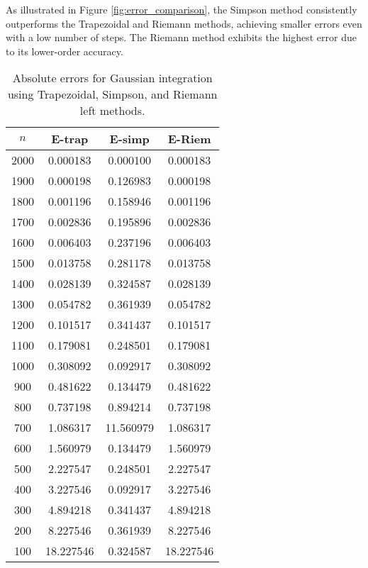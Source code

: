 \documentclass[twocolumn, 11pt]{article}
\begin{document}
As illustrated in Figure \ref{fig:error_comparison}, the Simpson method consistently outperforms the Trapezoidal and Riemann methods, achieving smaller errors even with a low number of steps. The Riemann method exhibits the highest error due to its lower-order accuracy.

\begin{table}[h!]
    \centering
    \begin{tabular}{|c|c|c|c|}
    \hline
    \textbf{\(n\)} & \textbf{E-trap} & \textbf{E-simp} & \textbf{E-Riem} \\
    \hline
    2000 & 0.000183 & 0.000100 & 0.000183 \\
    1900 & 0.000198 & 0.126983 & 0.000198 \\
    1800 & 0.001196 & 0.158946 & 0.001196 \\
    1700 & 0.002836 & 0.195896 & 0.002836 \\
    1600 & 0.006403 & 0.237196 & 0.006403 \\
    1500 & 0.013758 & 0.281178 & 0.013758 \\
    1400 & 0.028139 & 0.324587 & 0.028139 \\
    1300 & 0.054782 & 0.361939 & 0.054782 \\
    1200 & 0.101517 & 0.341437 & 0.101517 \\
    1100 & 0.179081 & 0.248501 & 0.179081 \\
    1000 & 0.308092 & 0.092917 & 0.308092 \\
    900  & 0.481622 & 0.134479 & 0.481622 \\
    800  & 0.737198 & 0.894214 & 0.737198 \\
    700  & 1.086317 & 11.560979 & 1.086317 \\
    600  & 1.560979 & 0.134479 & 1.560979 \\
    500  & 2.227547 & 0.248501 & 2.227547 \\
    400  & 3.227546 & 0.092917 & 3.227546 \\
    300  & 4.894218 & 0.341437 & 4.894218 \\
    200  & 8.227546 & 0.361939 & 8.227546 \\
    100  & 18.227546 & 0.324587 & 18.227546 \\
    \hline
    \end{tabular}
    \caption{Absolute errors for Gaussian integration using Trapezoidal, Simpson, and Riemann left methods.}
    \label{tab:integration_results}
\end{table}
\end{document}

